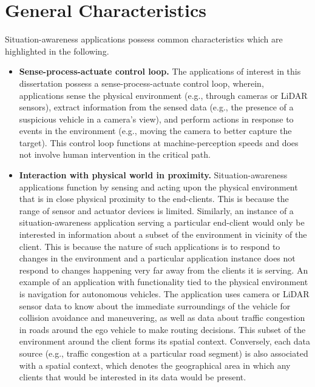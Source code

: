 \section{General Characteristics}
\label{sec:app_characteristics}
Situation-awareness applications possess common characteristics which are highlighted in the following.
\begin{itemize}
\item \textbf{Sense-process-actuate control loop. }  The applications of interest in this dissertation possess a sense-process-actuate control loop, wherein, applications sense the physical environment (e.g., through cameras or LiDAR sensors), extract information from the sensed data (e.g., the presence of a suspicious vehicle in a camera's view), and perform actions in response to events in the environment (e.g., moving the camera to better capture the target). This control loop functions at machine-perception speeds and does not involve human intervention in the critical path.
\item \textbf{Interaction with physical world in proximity. } 
Situation-awareness applications function by sensing and acting upon the physical environment that is in close physical proximity to the end-clients. This is because the range of sensor and actuator devices is limited. Similarly, an instance of a situation-awareness application serving a particular end-client would only be interested in information about a subset of the environment in vicinity of the client. This is because the nature of such applications is to respond to changes in the environment and a particular application instance does not respond to changes happening very far away from the clients it is serving. An example of an application with functionality tied to the physical environment is navigation for autonomous vehicles. The application uses camera or LiDAR sensor data to know about the immediate surroundings of the vehicle for collision avoidance and maneuvering, as well as data about traffic congestion in roads around the ego vehicle to make routing decisions. This subset of the environment around the client forms its spatial context. Conversely, each data source (e.g., traffic congestion at a particular road segment) is also associated with a spatial context, which denotes the geographical area in which any clients that would be interested in its data would be present.

\end{itemize}
